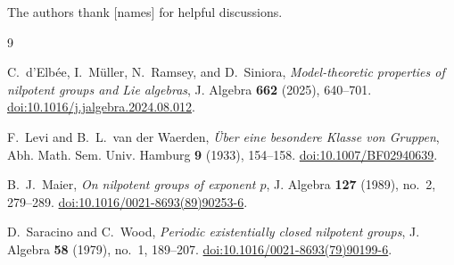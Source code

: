 \documentclass[11pt,reqno]{article}
\theoremstyle{definition}
\theoremstyle{remark}
\begin{document}
The authors thank [names] for helpful discussions.

% 
% 

\begin{thebibliography}{9}

C.~d'Elb\'ee, I.~M\"uller, N.~Ramsey, and D.~Siniora,
\emph{Model-theoretic properties of nilpotent groups and Lie algebras},
J. Algebra \textbf{662} (2025), 640--701.
\href{https://doi.org/10.1016/j.jalgebra.2024.08.012}
     {doi:10.1016/j.jalgebra.2024.08.012}.

F.~Levi and B.~L.~van der Waerden,
\emph{\"Uber eine besondere Klasse von Gruppen},
Abh. Math. Sem. Univ. Hamburg \textbf{9} (1933), 154--158.
\href{https://doi.org/10.1007/BF02940639}
     {doi:10.1007/BF02940639}.

B.~J.~Maier,
\emph{On nilpotent groups of exponent $p$},
J. Algebra \textbf{127} (1989), no.~2, 279--289.
\href{https://doi.org/10.1016/0021-8693(89)90253-6}
     {doi:10.1016/0021-8693(89)90253-6}.

D.~Saracino and C.~Wood,
\emph{Periodic existentially closed nilpotent groups},
J. Algebra \textbf{58} (1979), no.~1, 189--207.
\href{https://doi.org/10.1016/0021-8693(79)90199-6}
     {doi:10.1016/0021-8693(79)90199-6}.

\end{thebibliography}
\end{document}
